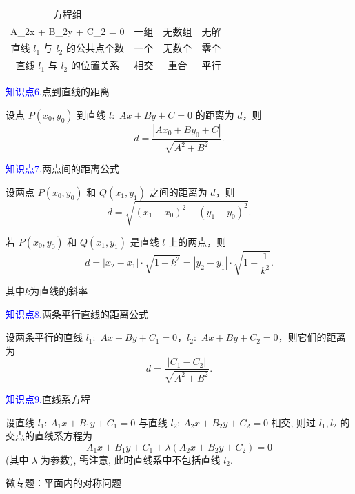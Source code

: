 \documentclass{article}
\begin{document}
\vspace{1em}

\begin{center}
\begin{tabular}{|c|c|c|c|}
\hline
方程组 \(\begin{cases} A_1x + B_1y + C_1 = 0, \\ A_2x + B_2y + C_2 = 0 \end{cases}\) 的解 & 一组 & 无数组 & 无解 \\
\hline
直线 \(l_1\) 与 \(l_2\) 的公共点个数 & 一个 & 无数个 & 零个 \\
\hline
直线 \(l_1\) 与 \(l_2\) 的位置关系 & 相交 & 重合 & 平行 \\
\hline
\end{tabular}
\end{center}
\vspace{1\baselineskip}

\textcolor{blue}{知识点6.}点到直线的距离

设点 \(P(x_0, y_0)\) 到直线 \(l:\) \(Ax + By + C = 0\) 的距离为 \(d\)，则
\[
d = \frac{|Ax_0 + By_0 + C|}{\sqrt{A^2 + B^2}}.
\]
\newpage

\textcolor{blue}{知识点7.}两点间的距离公式

设两点 \(P(x_0, y_0)\) 和 \(Q(x_1, y_1)\) 之间的距离为 \(d\)，则
\[
d = \sqrt{(x_1 - x_0)^2 + (y_1 - y_0)^2}.
\]

若 \(P(x_0, y_0)\) 和 \(Q(x_1, y_1)\) 是直线 \(l\) 上的两点，则
\[
d=|x_2 - x_1| \cdot \sqrt{1 + k^2} = |y_2 - y_1| \cdot \sqrt{1 + \frac{1}{k^2}}.
\]

其中$k$为直线的斜率


\textcolor{blue}{知识点8.}两条平行直线的距离公式

设两条平行的直线 \(l_1:\) \(Ax + By + C_1 = 0\)，\(l_2:\) \(Ax + By + C_2 = 0\)，则它们的距离为
\[
d = \frac{|C_1 - C_2|}{\sqrt{A^2 + B^2}}.
\]
\vspace{1\baselineskip}

\textcolor{blue}{知识点9.}直线系方程

设直线 \(l_1\): \(A_1x + B_1y + C_1 = 0\) 与直线 \(l_2\): \(A_2x + B_2y + C_2 = 0\) 相交, 则过 \(l_1, l_2\) 的交点的直线系方程为
\[
A_1x + B_1y + C_1 + \lambda(A_2x + B_2y + C_2) = 0
\]
(其中 \(\lambda\) 为参数), 需注意, 此时直线系中不包括直线 \(l_2\).
\vspace{2\baselineskip}

\begin{center}
    微专题：平面内的对称问题
\end{center}
\end{document}
